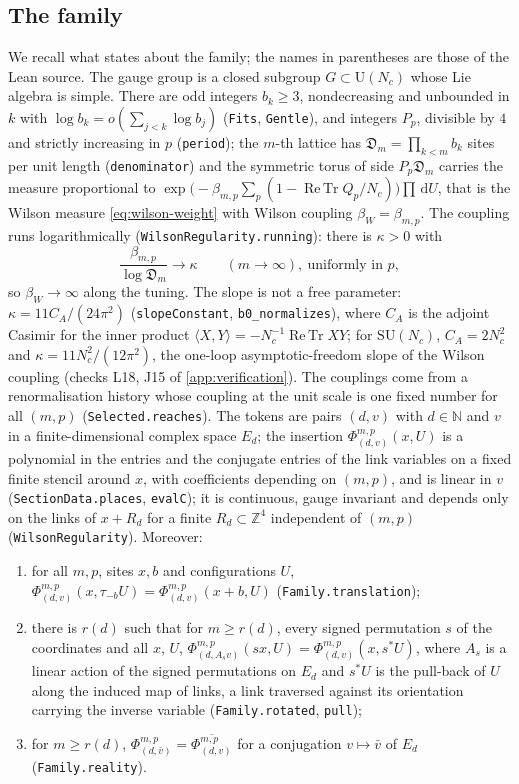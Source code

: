 \documentclass[11pt,a4paper]{amsart}
\theoremstyle{definition}
\theoremstyle{remark}
\numberwithin{equation}{section}
\DeclareMathOperator{\ReTr}{Re\,Tr}  %
\newcommand{\Z}{\mathbb{Z}}          %
\newcommand{\Nat}{\mathbb{N}}        %
\newcommand{\dd}{\,\mathrm{d}}             %
\newcommand{\SU}{\mathrm{SU}}              %
\newcommand{\U}{\mathrm{U}}                %
\newcommand{\Den}{\mathfrak D}            %
\newcommand{\betaW}{\beta_{W}}             %
\begin{document}
\subsection{The family}
We recall what \cite{openaiym} states about the family; the names in parentheses are those of the Lean source. The gauge group is a closed subgroup $G\subset\U(N_c)$ whose Lie algebra is simple. There are odd integers $b_k\ge3$, nondecreasing and unbounded in $k$ with $\log b_k=o(\sum_{j<k}\log b_j)$ (\texttt{Fits}, \texttt{Gentle}), and integers $P_p$, divisible by $4$ and strictly increasing in $p$ (\texttt{period}); the $m$-th lattice has $\Den_m=\prod_{k<m}b_k$ sites per unit length (\texttt{denominator}) and the symmetric torus of side $P_p\Den_m$ carries the measure proportional to $\exp\bigl(-\beta_{m,p}\sum_p(1-\ReTr Q_p/N_c)\bigr)\prod\dd U$, that is the Wilson measure \eqref{eq:wilson-weight} with Wilson coupling $\betaW=\beta_{m,p}$. The coupling runs logarithmically (\texttt{WilsonRegularity.running}): there is $\kappa>0$ with
\[
\frac{\beta_{m,p}}{\log \Den_m}\longrightarrow\kappa\qquad(m\to\infty),\ \text{uniformly in }p ,
\]
so $\betaW\to\infty$ along the tuning. The slope is not a free parameter: $\kappa=11C_A/(24\pi^2)$ (\texttt{slopeConstant}, \texttt{b0\_normalizes}), where $C_A$ is the adjoint Casimir for the inner product $\langle X,Y\rangle=-N_c^{-1}\ReTr XY$; for $\SU(N_c)$, $C_A=2N_c^2$ and $\kappa=11N_c^2/(12\pi^2)$, the one-loop asymptotic-freedom slope of the Wilson coupling (checks L18, J15 of \cref{app:verification}). The couplings come from a renormalisation history whose coupling at the unit scale is one fixed number for all $(m,p)$ (\texttt{Selected.reaches}). The tokens are pairs $(d,v)$ with $d\in\Nat$ and $v$ in a finite-dimensional complex space $E_d$; the insertion $\Phi_{(d,v)}^{m,p}(x,U)$ is a polynomial in the entries and the conjugate entries of the link variables on a fixed finite stencil around $x$, with coefficients depending on $(m,p)$, and is linear in $v$ (\texttt{SectionData.places}, \texttt{evalC}); it is continuous, gauge invariant and depends only on the links of $x+R_d$ for a finite $R_d\subset\Z^4$ independent of $(m,p)$ (\texttt{WilsonRegularity}). Moreover:
\begin{enumerate}[label=(O\arabic*),leftmargin=3em]
\item for all $m,p$, sites $x,b$ and configurations $U$, $\Phi^{m,p}_{(d,v)}(x,\tau_{-b}U)=\Phi^{m,p}_{(d,v)}(x+b,U)$ (\texttt{Family.translation});
\item there is $r(d)$ such that for $m\ge r(d)$, every signed permutation $s$ of the coordinates and all $x$, $U$, $\Phi^{m,p}_{(d,A_sv)}(sx,U)=\Phi^{m,p}_{(d,v)}(x,s^*U)$, where $A_s$ is a linear action of the signed permutations on $E_d$ and $s^*U$ is the pull-back of $U$ along the induced map of links, a link traversed against its orientation carrying the inverse variable (\texttt{Family.rotated}, \texttt{pull});
\item for $m\ge r(d)$, $\Phi^{m,p}_{(d,\bar v)}=\overline{\Phi^{m,p}_{(d,v)}}$ for a conjugation $v\mapsto\bar v$ of $E_d$ (\texttt{Family.reality}).
\end{enumerate}
\end{document}
